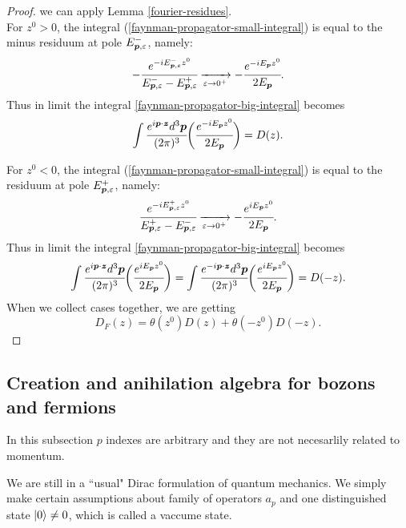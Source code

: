 \documentclass[main.tex]{subfiles}
\begin{document}
\begin{proof}
we can apply Lemma \ref{fourier-residues}.\\
For $z^0 > 0$, the integral (\ref{faynman-propagator-small-integral}) is equal to the minus residuum at pole $E^{-}_{\boldsymbol{p},  \varepsilon}$, namely:
\begin{equation}
-\cfrac{e^{-i E^{-}_{\boldsymbol{p},  \varepsilon} z^0}}{E^{-}_{\boldsymbol{p},  \varepsilon} - E^{+}_{\boldsymbol{p},  \varepsilon}} \xrightarrow[\varepsilon \to 0^+]{} - \cfrac{e^{-i E_{\boldsymbol{p}} z^0}}{2E_{\boldsymbol{p}}}.
\end{equation}
Thus in limit the integral \ref{faynman-propagator-big-integral} becomes
\begin{equation}
\int \cfrac{e^{i\boldsymbol{p}\cdot\boldsymbol{z}}d^3 \boldsymbol{p}}{(2\pi)^3}
\bigg( \cfrac{e^{-i E_{\boldsymbol{p}}z^0 }}{2E_{\boldsymbol{p}}} \bigg) = D(z).
\end{equation}


For $z^0 < 0$, the integral (\ref{faynman-propagator-small-integral}) is equal to the residuum at pole $E^{+}_{\boldsymbol{p},  \varepsilon}$, namely:
\begin{equation}
\cfrac{e^{-i E^{+}_{\boldsymbol{p},  \varepsilon} z^0}}{E^{+}_{\boldsymbol{p},  \varepsilon} - E^{-}_{\boldsymbol{p},  \varepsilon}} \xrightarrow[\varepsilon \to 0^+]{} -\cfrac{e^{i E_{\boldsymbol{p}} z^0}}{2E_{\boldsymbol{p}}}.
\end{equation}
Thus in limit the integral \ref{faynman-propagator-big-integral} becomes
\begin{equation}
\int \cfrac{e^{i\boldsymbol{p}\cdot\boldsymbol{z}}d^3 \boldsymbol{p}}{(2\pi)^3}
\bigg( \cfrac{e^{i E_{\boldsymbol{p}}z^0 }}{2E_{\boldsymbol{p}}} \bigg) = 
\int \cfrac{e^{-i\boldsymbol{p}\cdot\boldsymbol{z}}d^3 \boldsymbol{p}}{(2\pi)^3}
\bigg( \cfrac{e^{i E_{\boldsymbol{p}}z^0 }}{2E_{\boldsymbol{p}}} \bigg) = D(-z).
\end{equation}
When we collect cases together, we are getting
\begin{equation}
D_F(z) = \theta(z^0)D(z) + \theta(-z^0)D(-z). 
\end{equation}
\end{proof}


\subsection{Creation and anihilation algebra for bozons and fermions}
In this subsection $p$ indexes are arbitrary and they are not necesarlily related to momentum. 

We are still in a ``usual" Dirac formulation of quantum mechanics. We simply make certain assumptions about family of operators $a_p$ and one distinguished state    $\ket{0} \not= 0$, which is called a vaccume state.
\end{document}
